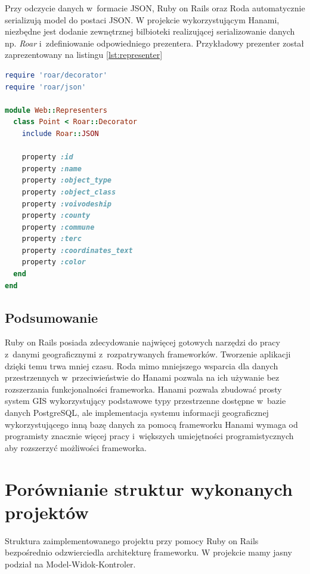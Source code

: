 \documentclass[archivemode]{mgr}
\begin{document}
Przy odczycie danych w~formacie JSON, Ruby on Rails oraz Roda automatycznie serializują model do postaci JSON. W projekcie wykorzystującym Hanami, niezbędne jest dodanie zewnętrznej bilbioteki realizującej serializowanie danych np. \textit{Roar} i~zdefiniowanie odpowiedniego prezentera. Przykładowy prezenter został zaprezentowany na listingu \ref{lst:representer}

 \begin{lstlisting}[language=Ruby, caption={Prezenter dla modelu Point}, label=lst:representer]
require 'roar/decorator'
require 'roar/json'

module Web::Representers
  class Point < Roar::Decorator
    include Roar::JSON

    property :id
    property :name
    property :object_type
    property :object_class
    property :voivodeship
    property :county
    property :commune
    property :terc
    property :coordinates_text
    property :color
  end
end
\end{lstlisting}

\subsection{Podsumowanie}

Ruby on Rails posiada zdecydowanie najwięcej gotowych narzędzi do pracy z~danymi geograficznymi z~rozpatrywanych frameworków. Tworzenie aplikacji dzięki temu trwa mniej czasu. Roda mimo mniejszego wsparcia dla danych przestrzennych w~przeciwieństwie do Hanami pozwala na ich używanie bez rozszerzania funkcjonalności frameworka. Hanami pozwala zbudować prosty system GIS wykorzystujący podstawowe typy przestrzenne dostępne w~bazie danych PostgreSQL, ale implementacja systemu informacji geograficznej wykorzystującego inną bazę danych za pomocą frameworku Hanami wymaga od programisty znacznie więcej pracy i~większych umiejętności programistycznych aby rozszerzyć możliwości frameworka.



\section{Porównianie struktur wykonanych projektów}

Struktura zaimplementowanego projektu przy pomocy Ruby on Rails bezpośrednio odzwierciedla architekturę frameworku. W projekcie mamy jasny podział na Model-Widok-Kontroler. 
\end{document}
